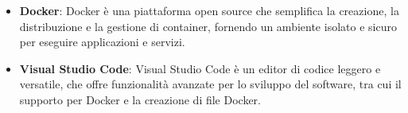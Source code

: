 \begin{itemize}
	\item \textbf{Docker}: Docker è una piattaforma open source che semplifica la creazione, la distribuzione e la gestione di container, fornendo un ambiente isolato e sicuro per eseguire applicazioni e servizi.
	\item \textbf{Visual Studio Code}: Visual Studio Code è un editor di codice leggero e versatile, che offre funzionalità avanzate per lo sviluppo del software, tra cui il supporto per Docker e la creazione di file Docker.
\end{itemize}
